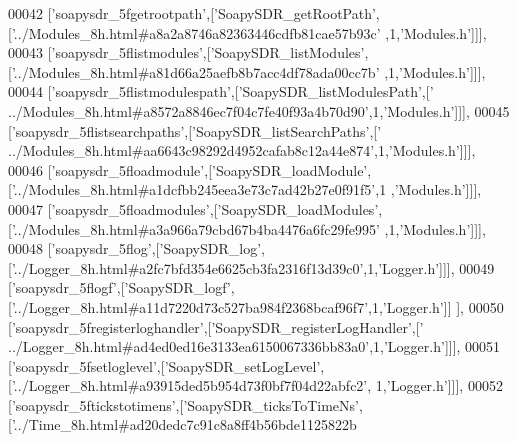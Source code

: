 \begin{DoxyCode}
00042   [\textcolor{stringliteral}{'soapysdr\_5fgetrootpath'},[\textcolor{stringliteral}{'SoapySDR\_getRootPath'},[\textcolor{stringliteral}{'../Modules\_8h.html#a8a2a8746a82363446cdfb81cae57b93c'}
      ,1,\textcolor{stringliteral}{'Modules.h'}]]],
00043   [\textcolor{stringliteral}{'soapysdr\_5flistmodules'},[\textcolor{stringliteral}{'SoapySDR\_listModules'},[\textcolor{stringliteral}{'../Modules\_8h.html#a81d66a25aefb8b7acc4df78ada00cc7b'}
      ,1,\textcolor{stringliteral}{'Modules.h'}]]],
00044   [\textcolor{stringliteral}{'soapysdr\_5flistmodulespath'},[\textcolor{stringliteral}{'SoapySDR\_listModulesPath'},[\textcolor{stringliteral}{'
      ../Modules\_8h.html#a8572a8846ec7f04c7fe40f93a4b70d90'},1,\textcolor{stringliteral}{'Modules.h'}]]],
00045   [\textcolor{stringliteral}{'soapysdr\_5flistsearchpaths'},[\textcolor{stringliteral}{'SoapySDR\_listSearchPaths'},[\textcolor{stringliteral}{'
      ../Modules\_8h.html#aa6643c98292d4952cafab8c12a44e874'},1,\textcolor{stringliteral}{'Modules.h'}]]],
00046   [\textcolor{stringliteral}{'soapysdr\_5floadmodule'},[\textcolor{stringliteral}{'SoapySDR\_loadModule'},[\textcolor{stringliteral}{'../Modules\_8h.html#a1dcfbb245eea3e73c7ad42b27e0f91f5'},1
      ,\textcolor{stringliteral}{'Modules.h'}]]],
00047   [\textcolor{stringliteral}{'soapysdr\_5floadmodules'},[\textcolor{stringliteral}{'SoapySDR\_loadModules'},[\textcolor{stringliteral}{'../Modules\_8h.html#a3a966a79cbd67b4ba4476a6fc29fe995'}
      ,1,\textcolor{stringliteral}{'Modules.h'}]]],
00048   [\textcolor{stringliteral}{'soapysdr\_5flog'},[\textcolor{stringliteral}{'SoapySDR\_log'},[\textcolor{stringliteral}{'../Logger\_8h.html#a2fc7bfd354e6625cb3fa2316f13d39c0'},1,\textcolor{stringliteral}{'Logger.h'}]]],
00049   [\textcolor{stringliteral}{'soapysdr\_5flogf'},[\textcolor{stringliteral}{'SoapySDR\_logf'},[\textcolor{stringliteral}{'../Logger\_8h.html#a11d7220d73c527ba984f2368bcaf96f7'},1,\textcolor{stringliteral}{'Logger.h'}]]
      ],
00050   [\textcolor{stringliteral}{'soapysdr\_5fregisterloghandler'},[\textcolor{stringliteral}{'SoapySDR\_registerLogHandler'},[\textcolor{stringliteral}{'
      ../Logger\_8h.html#ad4ed0ed16e3133ea6150067336bb83a0'},1,\textcolor{stringliteral}{'Logger.h'}]]],
00051   [\textcolor{stringliteral}{'soapysdr\_5fsetloglevel'},[\textcolor{stringliteral}{'SoapySDR\_setLogLevel'},[\textcolor{stringliteral}{'../Logger\_8h.html#a93915ded5b954d73f0bf7f04d22abfc2'},
      1,\textcolor{stringliteral}{'Logger.h'}]]],
00052   [\textcolor{stringliteral}{'soapysdr\_5ftickstotimens'},[\textcolor{stringliteral}{'SoapySDR\_ticksToTimeNs'},[\textcolor{stringliteral}{'../Time\_8h.html#ad20dedc7c91c8a8ff4b56bde1125822b
}
\end{DoxyCode}
